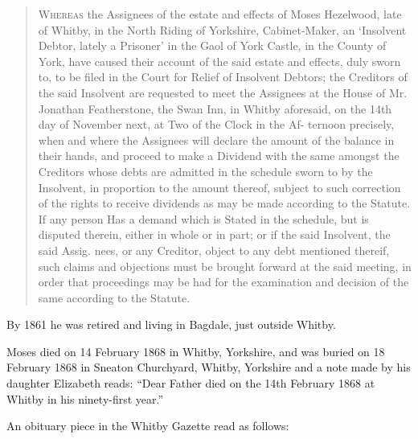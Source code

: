 \begin{quotation}
\textsc{Whereas} the Assignees of the estate and effects of Moses Hezelwood, late of Whitby, in the North Riding of Yorkshire, Cabinet-Maker, an `Insolvent Debtor, lately a Prisoner' in the Gaol of York Castle, in the County of York, have caused their account of the said estate and effects, duly sworn to, to be filed in the Court for Relief of Insolvent Debtors; the Creditors of the said Insolvent are requested to meet the Assignees at the House of Mr. Jonathan Featherstone, the Swan Inn, in Whitby aforesaid, on the 14th day of November next, at Two of the Clock in the Af- ternoon precisely, when and where the Assignees will declare the amount of the balance in their hands, and proceed to make a Dividend with the same amongst the Creditors whose debts are admitted in the schedule sworn to by the Insolvent, in proportion to the amount thereof, subject to such correction of the rights to receive dividends as may be made according to the Statute. If any person Has a demand which is Stated in the schedule, but is disputed therein, either in whole or in part; or if the said Insolvent, the said Assig. nees, or any Creditor, object to any debt mentioned thereif, such claims and objections must be brought forward at the said meeting, in order that proceedings may be had for the examination and decision of the same according to the Statute.
\end{quotation}

By 1861 he was retired and living in Bagdale, just outside Whitby. \cite{MHezelwood1861}

Moses died on 14 February 1868 in Whitby, Yorkshire, and was buried on 18 February 1868 in Sneaton Churchyard, Whitby, Yorkshire\cite{MHezelwoodDeath}
and a note made by his daughter Elizabeth reads: ``Dear Father died on the 14th February 1868 at Whitby in his ninety-first year.''

An obituary piece in the Whitby Gazette read as follows:\cite{MHezelwoodDeathnotice}

